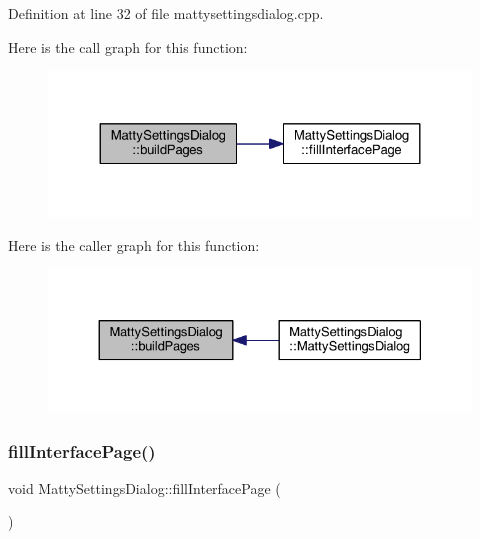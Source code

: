 Definition at line 32 of file mattysettingsdialog.\+cpp.

Here is the call graph for this function\+:
\nopagebreak
\begin{figure}[H]
\begin{center}
\leavevmode
\includegraphics[width=324pt]{classMattySettingsDialog_a92444461b31265858791d279e483069d_cgraph}
\end{center}
\end{figure}
Here is the caller graph for this function\+:
\nopagebreak
\begin{figure}[H]
\begin{center}
\leavevmode
\includegraphics[width=330pt]{classMattySettingsDialog_a92444461b31265858791d279e483069d_icgraph}
\end{center}
\end{figure}
\hypertarget{classMattySettingsDialog_a4c8eaeb364e8fa94fe89fdbe2eb822b5}{}\label{classMattySettingsDialog_a4c8eaeb364e8fa94fe89fdbe2eb822b5} 
\subsubsection{\texorpdfstring{fill\+Interface\+Page()}{fillInterfacePage()}}
{\footnotesize\ttfamily void Matty\+Settings\+Dialog\+::fill\+Interface\+Page (\begin{DoxyParamCaption}{ }\end{DoxyParamCaption})\hspace{0.3cm}{\ttfamily [private]}}



